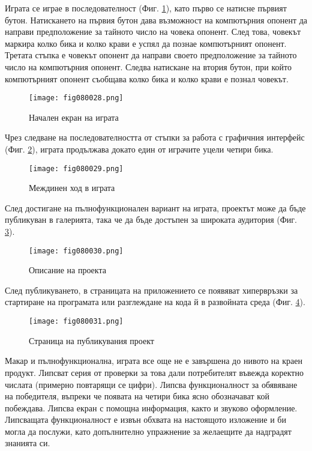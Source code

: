 Играта се играе в последователност (Фиг. \ref{fig080028}), като първо се натисне първият бутон. Натискането на първия бутон дава възможност на компютърния опонент да направи предположение за тайното число на човека опонент. След това, човекът маркира колко бика и колко крави е успял да познае компютърният опонент. Третата стъпка е човекът опонент да направи своето предположение за тайното число на компютърния опонент. Следва натискане на втория бутон, при който компютърният опонент съобщава колко бика и колко крави е познал човекът. 

\begin{figure}[H]
  \centering
  \texttt{[image: fig080028.png]}
  \caption{Начален екран на играта}
\label{fig080028}
\end{figure}

Чрез следване на последователността от стъпки за работа с графичния интерфейс (Фиг. \ref{fig080029}), играта продължава докато един от играчите уцели четири бика.

\begin{figure}[H]
  \centering
  \texttt{[image: fig080029.png]}
  \caption{Междинен ход в играта}
\label{fig080029}
\end{figure}

След достигане на пълнофункционален вариант на играта, проектът може да бъде публикуван в галерията, така че да бъде достъпен за широката аудитория (Фиг. \ref{fig080030}).

\begin{figure}[H]
  \centering
  \texttt{[image: fig080030.png]}
  \caption{Описание на проекта}
\label{fig080030}
\end{figure}

След публикуването, в страницата на приложението се появяват хипервръзки за стартиране на програмата или разглеждане на кода й в развойната среда (Фиг. \ref{fig080031}).

\begin{figure}[H]
  \centering
  \texttt{[image: fig080031.png]}
  \caption{Страница на публикувания проект}
\label{fig080031}
\end{figure}

Макар и пълнофункционална, играта все още не е завършена до нивото на краен продукт. Липсват серия от проверки за това дали потребителят въвежда коректно числата (примерно повтарящи се цифри). Липсва функционалност за обявяване на победителя, въпреки че появата на четири бика ясно обозначават кой побеждава. Липсва екран с помощна информация, както и звуково оформление. Липсващата функционалност е извън обхвата на настоящото изложение и би могла да послужи, като допълнително упражнение за желаещите да надградят знанията си.

